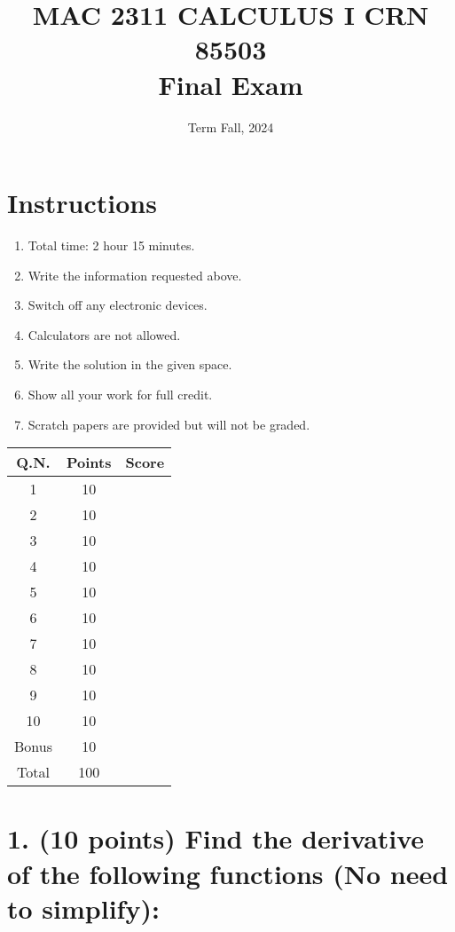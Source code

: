 \documentclass[12pt]{article}
\title{MAC 2311 CALCULUS I CRN 85503 \\ Final Exam}
\date{Term Fall, 2024}
\begin{document}
\maketitle

\section*{Instructions}

\begin{enumerate}
    \item Total time: 2 hour 15 minutes.
    \item Write the information requested above.
    \item Switch off any electronic devices.
    \item Calculators are not allowed. 
    \item Write the solution in the given space.
    \item Show all your work for full credit.
    \item Scratch papers are provided but will not be graded.
\end{enumerate}

\bigskip

\begin{center}
\begin{tabular}{|c|c|c|}
\hline
Q.N. & Points & Score \\
\hline
1 & 10 &  \\
2 & 10 &  \\
3 & 10 &  \\
4 & 10 &  \\
5 & 10 &  \\
6 & 10 &  \\
7 & 10 &  \\
8 & 10 &  \\
9 & 10 &  \\
10 & 10 &  \\
Bonus & 10 &  \\
Total & 100 &  \\
\hline
\end{tabular}
\end{center}

\newpage

\section*{1. (10 points) Find the derivative of the following functions (No need to simplify):}
\end{document}
